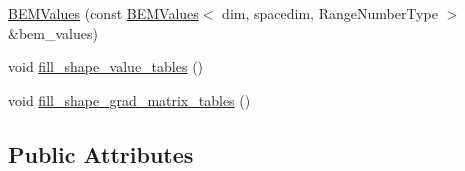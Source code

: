 \begin{DoxyCompactItemize}
\item 
\hyperlink{classLaplaceBEM_1_1BEMValues_ac40a849631e782f840a927e68bc2f9f6}{B\+E\+M\+Values} (const \hyperlink{classLaplaceBEM_1_1BEMValues}{B\+E\+M\+Values}$<$ dim, spacedim, Range\+Number\+Type $>$ \&bem\+\_\+values)
\item 
void \hyperlink{classLaplaceBEM_1_1BEMValues_a3fd86680a51e688d003d5a0bfe09629f}{fill\+\_\+shape\+\_\+value\+\_\+tables} ()
\item 
void \hyperlink{classLaplaceBEM_1_1BEMValues_a5383d5eb891f8cd742584e95aad976c8}{fill\+\_\+shape\+\_\+grad\+\_\+matrix\+\_\+tables} ()
\end{DoxyCompactItemize}
\subsection*{Public Attributes}
